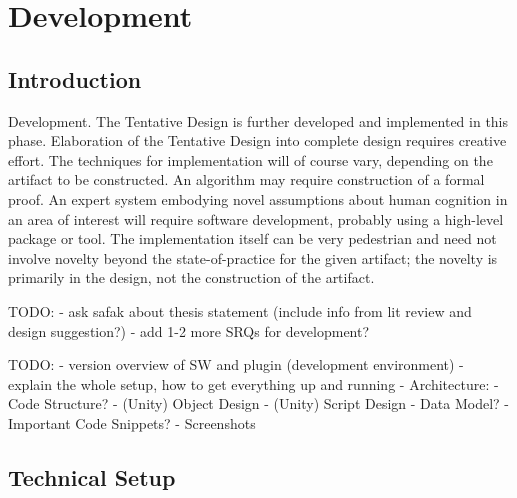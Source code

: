 
\chapter{Development}

\label{ChapterDevelopment}


\section{Introduction}

Development. The Tentative Design is further developed and implemented in this phase. Elaboration of the Tentative Design into complete design requires creative effort. The techniques for implementation will of course vary, depending on the artifact to be constructed. An algorithm may require construction of a formal proof. An expert system embodying novel assumptions about human cognition in an area of interest will require software development, probably using a high-level package or tool. The implementation itself can be very pedestrian and need not involve novelty beyond the state-of-practice for the given artifact; the novelty is primarily in the design, not the construction of the artifact.
\cite{Vaishnavi2008}


TODO:
- ask safak about thesis statement (include info from lit review and design suggestion?)
- add 1-2 more SRQs for development?

TODO:
- version overview of SW and plugin (development environment)
- explain the whole setup, how to get everything up and running
- Architecture:
- Code Structure?
- (Unity) Object Design
- (Unity) Script Design
- Data Model?
- Important Code Snippets?
- Screenshots



\section{Technical Setup}

